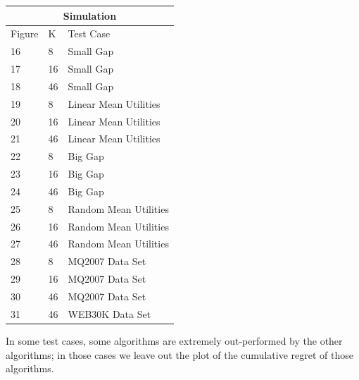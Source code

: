 \documentclass[MSc,beforeExam]{iitcsthesis}
\begin{document}
\begin{table}[h!]
\centering
\begin{tabular}{ |p{2cm}|p{2cm}|p{4cm}|  }

\hline
 \multicolumn{3}{|c|}{Simulation} \\
 \hline
   \hline
Figure & K & Test Case \\
\hline
  16     & 8  & Small Gap  \\
  \hline
  17     & 16  &  Small Gap  \\
  \hline
  18     & 46  &  Small Gap  \\
  \hline
  19     & 8  &  Linear Mean Utilities \\
  \hline
  20     & 16  & Linear Mean Utilities  \\
  \hline
  21     & 46  & Linear Mean Utilities  \\
  \hline
  22     & 8  &  Big Gap \\
  \hline
  23     & 16  &  Big Gap \\
  \hline
  24     & 46  &  Big Gap \\

  \hline
  25     & 8  &  Random Mean Utilities  \\
  \hline
  26     & 16  &  Random Mean Utilities  \\
  \hline
  27     & 46  &  Random Mean Utilities  \\
  \hline
  28     & 8  &  MQ2007 Data Set \\
  \hline
  29     & 16  & MQ2007 Data Set  \\
  \hline
  30     & 46  & MQ2007 Data Set  \\
  \hline
  31     & 46  & WEB30K Data Set  \\
  \hline
\end{tabular}
\end{table}
In some test cases, some algorithms are extremely out-performed by the other algorithms; in those cases we leave out the plot of the cumulative regret of those algorithms.
\newpage
\end{document}
